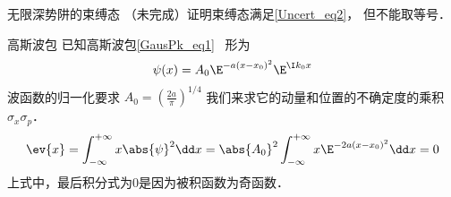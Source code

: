 \begin{example}{无限深势阱的束缚态}\label{Uncert_ex2}
（未完成）证明束缚态满足\autoref{Uncert_eq2}， 但不能取等号．
\end{example}

\begin{example}{高斯波包}\label{Uncert_ex1}
已知高斯波包\autoref{GausPk_eq1}~ 形为
\begin{equation}
\psi(x)=A_0\E^{-a(x-x_0)^2}\E^{\I k_0x}
\end{equation}
波函数的归一化要求 $A_0=(\frac{2a}{\pi})^{1/4}$
我们来求它的动量和位置的不确定度的乘积 $\sigma_x\sigma_p$．
\begin{equation}\label{Uncert_eq4}
\ev{x}=\int_{-\infty}^{+\infty}x\abs{\psi}^2\dd x=\abs{A_0}^2\int_{-\infty}^{+\infty}x\E^{-2a(x-x_0)^2}\dd x=0
\end{equation}
上式中，最后积分式为0是因为被积函数为奇函数．


\end{example}
